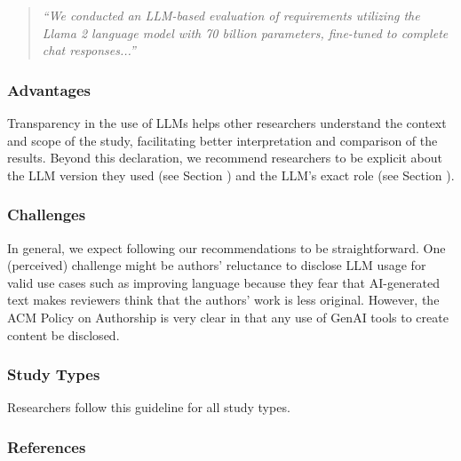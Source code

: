 \begin{quote}
\small
\it
``We conducted an LLM-based evaluation of requirements utilizing the Llama 2 language model with 70 billion parameters, fine-tuned to complete chat responses...''
\end{quote}

\subsubsection{Advantages}

Transparency in the use of LLMs helps other researchers understand the context and scope of the study, facilitating better interpretation and comparison of the results.
Beyond this declaration, we recommend researchers to be explicit about the LLM version they used (see Section \modelversion) and the LLM's exact role (see Section \toolarchitecture).

\subsubsection{Challenges}

In general, we expect following our recommendations to be straightforward.
One (perceived) challenge might be authors' reluctance to disclose LLM usage for valid use cases such as improving language because they fear that AI-generated text makes reviewers think that the authors' work is less original.
However, the ACM Policy on Authorship is very clear in that any use of GenAI tools to create content \must be disclosed.

\subsubsection{Study Types}

Researchers \must follow this guideline for all study types.

\subsubsection{References}





